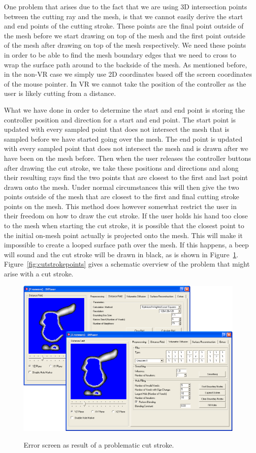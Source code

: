 One problem that arises due to the fact that we are using 3D intersection points between the cutting ray and the mesh, is that we cannot easily derive the start and end points of the cutting stroke. These points are the final point outside of the mesh before we start drawing on top of the mesh and the first point outside of the mesh after drawing on top of the mesh respectively. We need these points in order to be able to find the mesh boundary edges that we need to cross to wrap the surface path around to the backside of the mesh. As mentioned before, in the non-VR case we simply use 2D coordinates based off the screen coordinates of the mouse pointer. In VR we cannot take the position of the controller as the user is likely cutting from a distance. 

What we have done in order to determine the start and end point is storing the controller position and direction for a start and end point. The start point is updated with every sampled point that does not intersect the mesh that is sampled before we have started going over the mesh. The end point is updated with every sampled point that does not intersect the mesh and is drawn after we have been on the mesh before. Then when the user releases the controller buttons after drawing the cut stroke, we take these positions and directions and along their resulting rays find the two points that are closest to the first and last point drawn onto the mesh. Under normal circumstances this will then give the two points outside of the mesh that are closest to the first and final cutting stroke points on the mesh. This method does however somewhat restrict the user in their freedom on how to draw the cut stroke. If the user holds his hand too close to the mesh when starting the cut stroke, it is possible that the closest point to the initial on-mesh point actually is projected onto the mesh. This will make it impossible to create a looped surface path over the mesh. If this happens, a beep will sound and the cut stroke will be drawn in black, as is shown in Figure~\ref{fig:errordisplay}. Figure~\ref{fig:cutstrokepoints} gives a schematic overview of the problem that might arise with a cut stroke.

\begin{figure}[!h]
    \centering
    \includegraphics[width=0.7260\linewidth]{figures/voldiff_ui}\\
    \caption[Error screen as result of a problematic cut stroke.]{Error screen as result of a problematic cut stroke.
      \label{fig:errordisplay}}
\end{figure}

